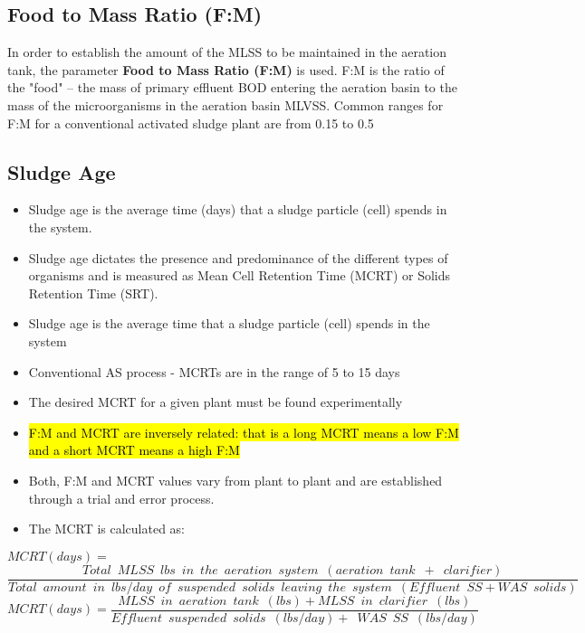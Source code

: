 \subsection{Food to Mass Ratio (F:M)}

In order to establish the amount of the MLSS to be maintained in the aeration tank, the parameter \textbf{Food to Mass Ratio (F:M)} is used.  F:M is the ratio of the "food" – the mass of primary effluent BOD entering the aeration basin to the mass of the microorganisms in the aeration basin \textemdash MLVSS.  Common ranges for F:M for a conventional activated sludge plant are from 0.15 to 0.5\\
\subsection{Sludge Age}
\begin{itemize}
\item Sludge age is the average time (days) that a sludge particle (cell) spends in the system.  \item Sludge age dictates the presence and predominance of the different types of organisms and is measured as Mean Cell Retention Time (MCRT) or Solids Retention Time (SRT).\\
\item Sludge age is the average time that a sludge particle (cell) spends in the system
\item Conventional AS process - MCRTs are in the range of 5 to 15 days
\item The desired MCRT for a given plant must be found experimentally
\item \hl{F:M and MCRT are inversely related: that is a long MCRT means a low F:M and a short MCRT means a high F:M} 
\item Both, F:M and MCRT values vary from plant to plant and are established through a trial and error process.
\item The MCRT is calculated as:\\ 
\end{itemize}

\vspace{0.2cm}
$MCRT(days) = $\\
$\dfrac{Total \enspace MLSS \enspace lbs \enspace in \enspace the \enspace aeration \enspace system \enspace (aeration \enspace tank \enspace + \enspace clarifier)}{Total \enspace amount \enspace in \enspace lbs/day \enspace of \enspace suspended \enspace solids \enspace leaving  \enspace the \enspace system \enspace(Effluent\enspace SS+ WAS \enspace solids)}$\\
\vspace{0.4cm} 
$MCRT (days) = \dfrac{MLSS \enspace in \enspace aeration \enspace tank \enspace (lbs)+MLSS \enspace in \enspace clarifier \enspace (lbs)}{Effluent \enspace suspended \enspace solids \enspace (lbs/day)+\enspace WAS \enspace SS \enspace (lbs/day)}$\\
\vspace{5mm}
